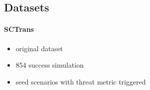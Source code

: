  


\subsection{Datasets}
\paragraph{SCTrans}
\begin{itemize}
    \item original dataset
    \item 854 success simulation
    \item seed scenarios with threat metric triggered
\end{itemize}